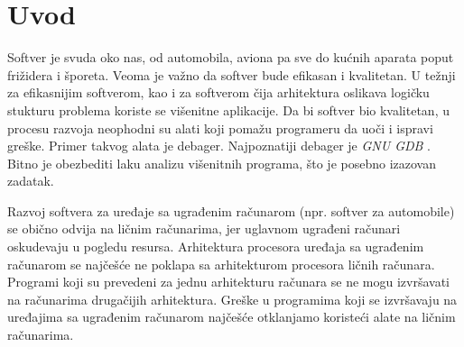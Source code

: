 \documentclass[12pt,oneside]{memoir}
\begin{document}
\frontmatter
\naslovna
\komisija
\apstrakt
\tableofcontents*

\mainmatter

\chapter{Uvod}

Softver je svuda oko nas, od automobila, aviona pa sve do kućnih aparata poput frižidera i šporeta. Veoma je važno da softver bude efikasan i kvalitetan. U težnji za efikasnijim softverom, kao i za softverom čija arhitektura oslikava logičku stukturu problema koriste se višenitne aplikacije. Da bi softver bio kvalitetan, u procesu razvoja neophodni su alati koji pomažu programeru da uoči i ispravi greške. Primer takvog alata je debager. Najpoznatiji debager je \emph{GNU GDB} \cite{GDB}. Bitno je obezbediti laku analizu višenitnih programa, što je posebno izazovan zadatak.

Razvoj softvera za uređaje sa ugrađenim računarom (npr. softver za automobile) se obično odvija na ličnim računarima, jer uglavnom ugrađeni računari oskudevaju u pogledu resursa. Arhitektura procesora uređaja sa ugrađenim računarom se najčešće ne poklapa sa  arhitekturom procesora ličnih računara. Programi koji su prevedeni za jednu arhitekturu računara se ne mogu izvršavati na računarima drugačijih arhitektura. Greške u programima koji se izvršavaju na uređajima sa ugrađenim računarom najčešće otklanjamo koristeći alate na ličnim računarima.
\end{document}
